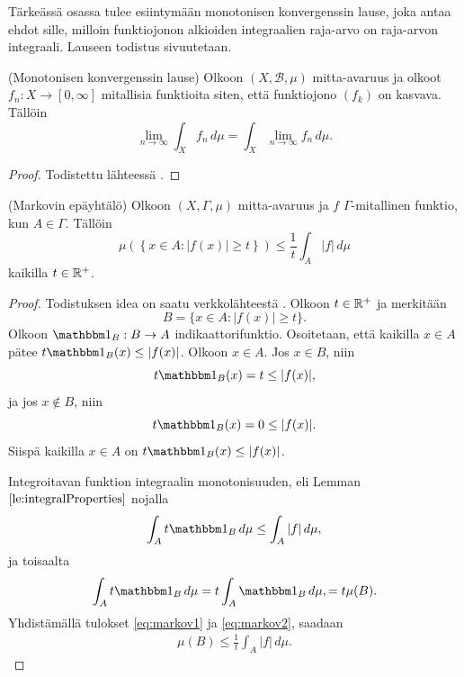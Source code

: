 \documentclass[12pt,oneside,a4paper]{amsbook} %
\begin{document}
Tärkeässä osassa tulee esiintymään monotonisen konvergenssin lause, joka antaa ehdot sille, milloin funktiojonon alkioiden integraalien raja-arvo on raja-arvon integraali. Lauseen todistus sivuutetaan.
\begin{theorem} \label{thm:monoConvThm}
    (Monotonisen konvergenssin lause) Olkoon $(X, \mathcal{B}, \mu)$ mitta-avaruus ja olkoot $f_n:X\to [0, \infty]$ mitallisia funktioita siten, että funktiojono $(f_k)$ on kasvava. Tällöin
    \begin{equation*}
        \lim_{n\to\infty} \int_X f_n \, d\mu = \int_X \lim_{n\to \infty} f_n \, d\mu.
    \end{equation*}
\end{theorem}
\begin{proof}
    Todistettu lähteessä \cite[s. 107]{tao}.
\end{proof}


\begin{theorem}\label{thm:markov}
    (Markovin epäyhtälö) Olkoon $(X, \Gamma, \mu)$ mitta-avaruus ja $f$ $\Gamma$-mitallinen funktio, kun $A \in \Gamma$. Tällöin
    \begin{equation*}
        \mu(\left\{x \in A : |f(x)| \ge t\right\}) \le \frac{1}{t}\int_A |f| \, d\mu
    \end{equation*}
    kaikilla $t\in {\mathbb{R}^{+}}$.
\end{theorem}
\begin{proof}
    Todistuksen idea on saatu verkkolähteestä \cite{markov}. Olkoon $t \in {\mathbb{R}^{+}}$ ja merkitään
    \begin{equation*}
        B = \{x \in A : |f(x)| \ge t\}.
    \end{equation*}
    Olkoon $\indfct{B}: B \to A$ indikaattorifunktio. Osoitetaan, että kaikilla $x\in A$ pätee $t\indfct{B}(x) \le |f(x)|$. Olkoon $x \in A$. Jos $x \in B$, niin 
    \begin{equation*}
        t\indfct B (x) = t \le |f(x)|,
    \end{equation*}
    ja jos $x \notin B$, niin
    \begin{equation*}
        t\indfct B (x) = 0 \le |f(x)|.
    \end{equation*}
    Siispä kaikilla $x\in A$ on $t\indfct{B}(x) \le |f(x)|$.
    
    Integroitavan funktion integraalin monotonisuuden, eli Lemman $\ref{le:integralProperties}$ nojalla
    \begin{equation}\label{eq:markov1}
        \int_A t\indfct{B} \, d\mu \le \int_A |f| \, d\mu,
    \end{equation}
    ja toisaalta
    \begin{equation}\label{eq:markov2}
        \int_A t\indfct{B} \, d\mu = t\int_A \indfct{B} \, d\mu, = t\mu(B).
    \end{equation}
    Yhdistämällä tulokset \eqref{eq:markov1} ja \eqref{eq:markov2}, saadaan
    \begin{align*}
        \mu(B) \le \frac{1}{t}\int_A |f| \, d\mu.
    \end{align*}
    
\end{proof}
\end{document}
